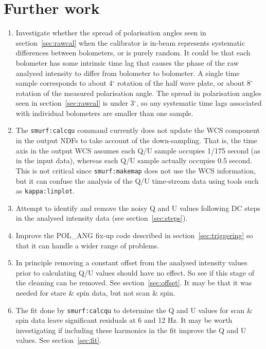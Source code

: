 \documentclass[twoside,11pt]{starlink}
\begin{document}
\section{Further work}
\begin{enumerate}

\item Investigate whether the spread of polarisation angles seen in
section~\ref{sec:rawcal} when the calibrator is in-beam represents
systematic differences between bolometers, or is purely random. It could
be that each bolometer has some intrinsic time lag that causes the phase
of the raw analysed intensity to differ from bolometer to bolometer. A
single time sample corresponds to about 4$^\circ$ rotation of the half
wave plate, or about 8$^\circ$ rotation of the measured polarisation
angle. The spread in polarisation angles seen in section~\ref{sec:rawcal}
is under 3$^\circ$, so any systematic time lags associated with
individual bolometers are smaller than one sample.

\item The \texttt{smurf:calcqu} command currently does not update the WCS
component in the output NDFs to take account of the down-sampling. That is,
the time axis in the output WCS assumes each Q/U sample occupies 1/175
second (as in the input data), whereas each Q/U sample actually occupies 0.5
second. This is not critical since \texttt{smurf:makemap} does not use the
WCS information, but it can confuse the analysis of the Q/U time-stream data
using tools such as \texttt{kappa:linplot}.

\item Attempt to identify and remove the noisy Q and U values following
DC steps in the analysed intensity data (see section~\ref{sec:steps}).

\item Improve the POL\_ANG fix-up code described in
section~\ref{sec:triggering} so that it can handle a wider range of
problems.

\item In principle removing a constant offset from the analysed intensity
values prior to calculating Q/U values should have no effect. So see if
this stage of the cleaning can be removed. See section~\ref{sec:offset}.
It may be that it was needed for stare \& spin data, but not scan \& spin.

\item The fit done by \texttt{smurf:calcqu} to determine the Q and U
values for scan \& spin data leave significant residuals at 6 and 12 Hz.
It may be worth investigating if including these harmonics in the fit
improve the Q and U values. See section~\ref{sec:fit}.


\end{enumerate}
\end{document}
